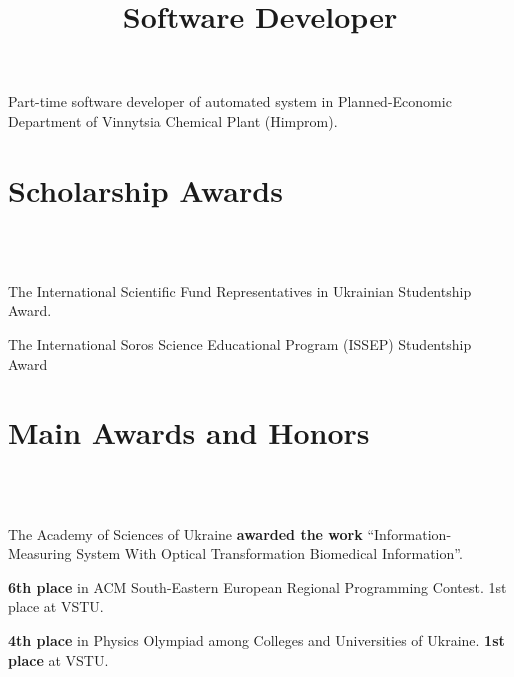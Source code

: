 \documentclass[10pt,overlapped,line]{res}
\newcommand{\mplace}[1]{\textbf{#1}}
\begin{document}
\begin{resume}
\title{Software Developer}
\begin{position}
Part-time software developer of automated system in
Planned-Economic Department of Vinnytsia Chemical Plant (Himprom).
\end{position}

\section{Scholarship Awards}
\begin{format}
  \\ 
  \body\\
\end{format}

\employer{} 
\begin{position}
 The International Scientific Fund Representatives in Ukrainian Studentship Award. 
\end{position}

\employer{} 
\begin{position}
 The International Soros Science Educational Program (ISSEP) Studentship Award
\end{position}


\section{Main Awards and Honors}
\begin{format}
   \\ 
  \body\\
\end{format}

\begin{position}
  The Academy of Sciences of Ukraine \mplace{awarded the work}
  ``Information-Measuring System With Optical Transformation
  Biomedical Information''.
\end{position}

\begin{position}
  \mplace{6th place} in ACM South-Eastern European Regional
  Programming Contest. 1st place at VSTU.
\end{position}

\begin{position}
  \mplace{4th place} in Physics Olympiad among Colleges and
  Universities of Ukraine. \mplace{1st place} at VSTU.
\end{position}


\end{resume}
\end{document}
